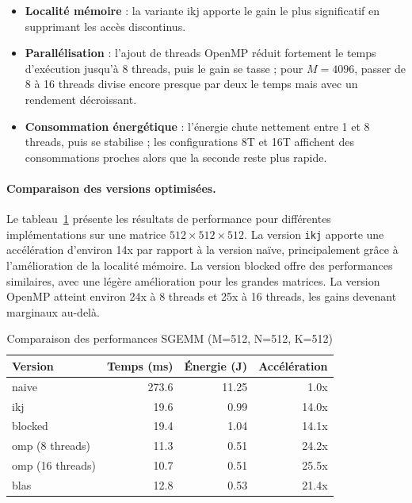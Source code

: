 \documentclass[a4paper,11pt]{article}
\begin{document}
\begin{itemize}
\item \textbf{Localité mémoire} : la variante ikj apporte le gain le plus significatif en supprimant les accès discontinus.
\item \textbf{Parallélisation} : l'ajout de threads OpenMP réduit fortement le temps d'exécution jusqu'à 8 threads, puis le gain se tasse ; pour $M=4096$, passer de 8 à 16 threads divise encore presque par deux le temps mais avec un rendement décroissant.
\item \textbf{Consommation énergétique} : l'énergie chute nettement entre 1 et 8 threads, puis se stabilise ; les configurations 8T et 16T affichent des consommations proches alors que la seconde reste plus rapide.
\end{itemize}


\paragraph{Comparaison des versions optimisées.}

Le tableau~\ref{tab:optimizations} présente les résultats de performance pour différentes implémentations sur une matrice $512 \times 512 \times 512$. La version \texttt{ikj} apporte une accélération d'environ 14x par rapport à la version naïve, principalement grâce à l'amélioration de la localité mémoire. La version blocked offre des performances similaires, avec une légère amélioration pour les grandes matrices. La version OpenMP atteint environ 24x à 8 threads et 25x à 16 threads, les gains devenant marginaux au-delà.

\begin{table}[H]
\centering
\caption{Comparaison des performances SGEMM (M=512, N=512, K=512)}
\label{tab:optimizations}
\begin{tabular}{lrrr}
\toprule
Version & Temps (ms) & Énergie (J) & Accélération \\
\midrule
naive & 273.6 & 11.25 & 1.0x \\
ikj & 19.6 & 0.99 & 14.0x \\
blocked & 19.4 & 1.04 & 14.1x \\
omp (8 threads) & 11.3 & 0.51 & 24.2x \\
omp (16 threads) & 10.7 & 0.51 & 25.5x \\
blas & 12.8 & 0.53 & 21.4x \\
\bottomrule
\end{tabular}
\end{table}
\end{document}
